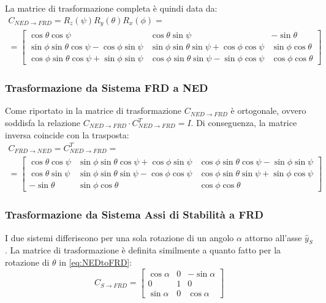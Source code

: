 La matrice di trasformazione completa è quindi data da:
\begin{multline}
    \label{eq:NEDtoFRD}
    C_{NED \rightarrow FRD} = R_{z}(\psi)R_{y}(\theta)R_{x}(\phi) = \\ = \begin{bmatrix}
        \cos\theta\cos\psi                            & \cos\theta\sin\psi                            & -\sin\theta        \\
        \sin\phi\sin\theta\cos\psi - \cos\phi\sin\psi & \sin\phi\sin\theta\sin\psi + \cos\phi\cos\psi & \sin\phi\cos\theta \\
        \cos\phi\sin\theta\cos\psi + \sin\phi\sin\psi & \cos\phi\sin\theta\sin\psi - \sin\phi\cos\psi & \cos\phi\cos\theta
    \end{bmatrix}
\end{multline}

\subsubsection{Trasformazione da Sistema FRD a NED}
Come riportato in \cite{smith_aircraft_flight_mechanics} la matrice di trasformazione $C_{NED \rightarrow FRD}$ è ortogonale, ovvero soddisfa la relazione $C_{NED \rightarrow FRD} \cdot C_{NED \rightarrow FRD}^T = I$.
Di conseguenza, la matrice inversa coincide con la trasposta:
\begin{multline}
    \label{eq:FRDtoNED}
    C_{FRD \rightarrow NED}  = C_{NED \rightarrow FRD}^T = \\
    = \begin{bmatrix}
        \cos\theta\cos\psi & \sin\phi\sin\theta\cos\psi + \cos\phi\sin\psi & \cos\phi\sin\theta\cos\psi - \sin\phi\sin\psi \\
        \cos\theta\sin\psi & \sin\phi\sin\theta\sin\psi - \cos\phi\cos\psi & \cos\phi\sin\theta\sin\psi + \sin\phi\cos\psi \\
        -\sin\theta        & \sin\phi\cos\theta                            & \cos\phi\cos\theta
    \end{bmatrix}
\end{multline}

\subsubsection{Trasformazione da Sistema Assi di Stabilità a FRD}
I due sistemi differiscono per una sola rotazione di un angolo $\alpha$ attorno all'asse $\hat{y}_{S}$. La matrice di trasformazione è definita similmente a quanto fatto per la rotazione di $\theta$ in \eqref{eq:NEDtoFRD}:
\begin{equation}
    \label{eq:StoFRD}
    C_{S \rightarrow FRD} = \begin{bmatrix}
        \cos\alpha & 0 & -\sin\alpha \\
        0          & 1 & 0           \\
        \sin\alpha & 0 & \cos\alpha
    \end{bmatrix}
\end{equation}

